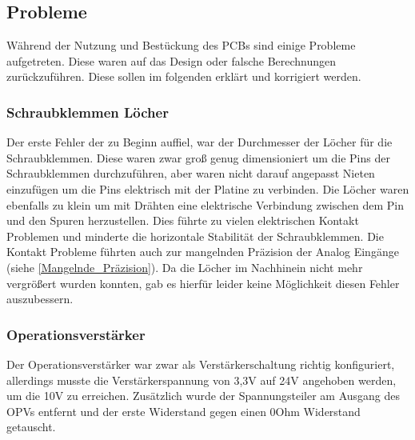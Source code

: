 \subsection{Probleme}
Während der Nutzung und Bestückung des \ac{PCB}s sind einige Probleme aufgetreten. Diese waren auf das Design oder falsche Berechnungen zurückzuführen. Diese sollen im folgenden erklärt und korrigiert werden.
\subsubsection{Schraubklemmen Löcher}
Der erste Fehler der zu Beginn auffiel, war der Durchmesser der Löcher für die Schraubklemmen. Diese waren zwar groß genug dimensioniert um die Pins der Schraubklemmen durchzuführen, aber waren nicht darauf angepasst Nieten einzufügen um die Pins elektrisch mit der Platine zu verbinden. Die Löcher waren ebenfalls zu klein um mit Drähten eine elektrische Verbindung zwischen dem Pin und den Spuren herzustellen. Dies führte zu vielen elektrischen Kontakt Problemen und minderte die horizontale Stabilität der Schraubklemmen. Die Kontakt Probleme führten auch zur mangelnden Präzision der Analog Eingänge (siehe \autoref{Mangelnde_Präzision}). Da die Löcher im Nachhinein nicht mehr vergrößert wurden konnten, gab es hierfür leider keine Möglichkeit diesen Fehler auszubessern.
\subsubsection{Operationsverstärker}
Der Operationsverstärker war zwar als Verstärkerschaltung richtig konfiguriert, allerdings musste die Verstärkerspannung von 3,3V auf 24V angehoben werden, um die 10V zu erreichen. Zusätzlich wurde der Spannungsteiler am Ausgang des OPVs entfernt und der erste Widerstand gegen einen 0Ohm Widerstand getauscht.
